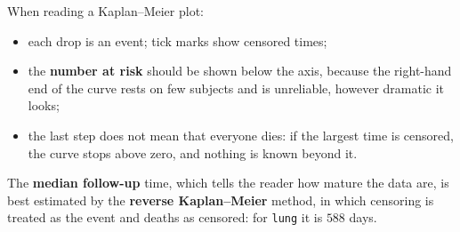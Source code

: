 \documentclass[11pt,a4paper]{article}
\numberwithin{equation}{section}
\theoremstyle{definition}
\begin{document}
When reading a Kaplan--Meier plot:
\begin{itemize}
\item each drop is an event; tick marks show censored times;
\item the \textbf{number at risk} should be shown below the axis, because the right-hand end of the curve rests on few subjects and is unreliable, however dramatic it looks;
\item the last step does not mean that everyone dies: if the largest time is censored, the curve stops above zero, and nothing is known beyond it.
\end{itemize}
The \textbf{median follow-up} time, which tells the reader how mature the data are, is best estimated by the \textbf{reverse Kaplan--Meier} method, in which censoring is treated as the event and deaths as censored: for \texttt{lung} it is $588$ days.
\end{document}
